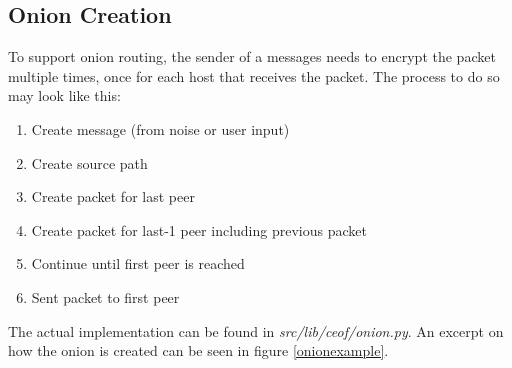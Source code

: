\subsection{Onion Creation}
To support onion routing, the sender of a messages needs to encrypt the packet
multiple times, once for each host that receives the packet. 
The process to do so may look like this:
\begin{enumerate}
\item Create message (from noise or user input)
\item Create source path
\item Create packet for last peer
\item Create packet for last-1 peer including previous packet
\item Continue until first peer is reached
\item Sent packet to first peer 
\end{enumerate}
The actual implementation can be found in \textit{src/lib/ceof/onion.py}.
An excerpt on how the onion is created can be seen in figure \ref{onionexample}.
